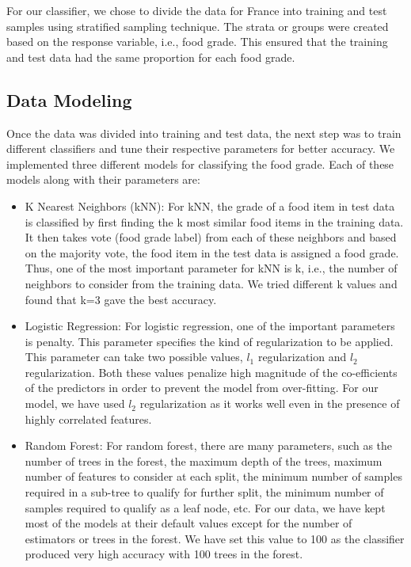 \documentclass[sigconf]{acmart}
\begin{document}
For our classifier, we chose to divide the data for France into training and test samples using stratified sampling technique. The strata or groups were created based on the response variable, i.e., food grade. This ensured that the training and test data had the same proportion for each food grade.

\subsection{Data Modeling}
Once the data was divided into training and test data, the next step was to train different classifiers and tune their respective parameters for better accuracy. We implemented three different models for classifying the food grade. Each of these models along with their parameters are:

\begin{itemize}
	\item K Nearest Neighbors (kNN): For kNN, the grade of a food item in test data is classified by first finding the k most similar food items in the training data. It then takes vote (food grade label) from each of these neighbors and based on the majority vote, the food item in the test data is assigned a food grade. Thus, one of the most important parameter for kNN is k, i.e., the number of neighbors to consider from the training data. We tried different k values and found that k=3 gave the best accuracy.
	\item Logistic Regression: For logistic regression, one of the important parameters is penalty. This parameter specifies the kind of regularization to be applied. This parameter can take two possible values, $l_1$ regularization and $l_2$ regularization. Both these values penalize high magnitude of the co-efficients of the predictors in order to prevent the model from over-fitting. For our model, we have used $l_2$ regularization as it works well even in the presence of highly correlated features. 
	\item Random Forest: For random forest, there are many parameters, such as the number of trees in the forest, the maximum depth of the trees, maximum number of features to consider at each split, the minimum number of samples required in a sub-tree to qualify for further split, the minimum number of samples required to qualify as a leaf node, etc. For our data, we have kept most of the models at their default values except for the number of estimators or trees in the forest. We have set this value to 100 as the classifier produced very high accuracy with 100 trees in the forest.
\end{itemize}
\end{document}
